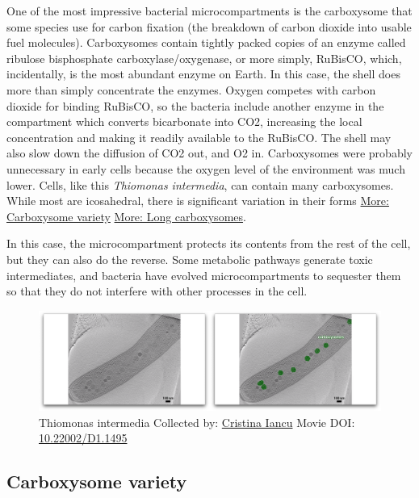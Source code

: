 \documentclass[]{tufte-book}
\begin{document}
One of the most impressive bacterial microcompartments is the
carboxysome that some species use for carbon fixation (the breakdown of
carbon dioxide into usable fuel molecules). Carboxysomes contain tightly
packed copies of an enzyme called ribulose bisphosphate
carboxylase/oxygenase, or more simply, RuBisCO, which, incidentally, is
the most abundant enzyme on Earth. In this case, the shell does more
than simply concentrate the enzymes. Oxygen competes with carbon dioxide
for binding RuBisCO, so the bacteria include another enzyme in the
compartment which converts bicarbonate into CO2, increasing the local
concentration and making it readily available to the RuBisCO. The shell
may also slow down the diffusion of CO2 out, and O2 in. Carboxysomes
were probably unnecessary in early cells because the oxygen level of the
environment was much lower. Cells, like this \emph{Thiomonas
intermedia}, can contain many carboxysomes. While most are icosahedral,
there is significant variation in their forms
\protect\hyperlink{Carboxysome_variety}{More: Carboxysome variety}
\protect\hyperlink{Long_carboxysomes}{More: Long carboxysomes}.

In this case, the microcompartment protects its contents from the rest
of the cell, but they can also do the reverse. Some metabolic pathways
generate toxic intermediates, and bacteria have evolved
microcompartments to sequester them so that they do not interfere with
other processes in the cell.





\begin{figure}
\includegraphics{movie_stills/4_7} \caption[Thiomonas intermedia Collected by:
\protect\hyperlink{cristina_iancu}{Cristina Iancu} Movie DOI:
\href{https://doi.org/10.22002/D1.1495}{10.22002/D1.1495}]{Thiomonas intermedia Collected by:
\protect\hyperlink{cristina_iancu}{Cristina Iancu} Movie DOI:
\href{https://doi.org/10.22002/D1.1495}{10.22002/D1.1495}}\label{fig:4-7}
\end{figure}

\hypertarget{Carboxysome_variety}{\subsection{Carboxysome
variety}\label{Carboxysome_variety}}
\end{document}

